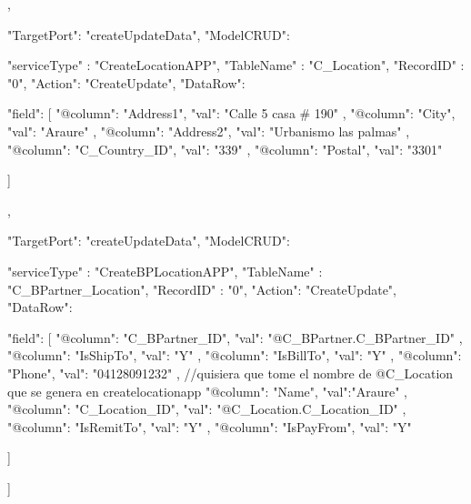 {{{{                },
                {
                "TargetPort": "createUpdateData",
                "ModelCRUD": {
                "serviceType" : "CreateLocationAPP",
                "TableName" : "C_Location",
                "RecordID" : "0",
                "Action": "CreateUpdate",
                 "DataRow": {
                "field": [
                    {
                        "@column": "Address1",
                        "val": "Calle 5 casa # 190"
                    },
                    {
                        "@column": "City",
                        "val": "Araure"
                    },
                    {
                        "@column": "Address2",
                        "val": "Urbanismo las palmas"
                    },
                    {
                        "@column": "C_Country_ID",
                        "val": "339"
                    },
                    {
                        "@column": "Postal",
                        "val": "3301"
                    }
                 
                ]
                }


                }

                
                
                },
                {
                "TargetPort": "createUpdateData",
                "ModelCRUD": {
                "serviceType" : "CreateBPLocationAPP",
                "TableName" : "C_BPartner_Location",
                "RecordID" : "0",
                "Action": "CreateUpdate",
                 "DataRow": {
                "field": [
                    {
                        "@column": "C_BPartner_ID",
                        "val": "@C_BPartner.C_BPartner_ID"
                    },
                     {
                        "@column": "IsShipTo",
                        "val": "Y"
                    },
                       {
                        "@column": "IsBillTo",
                        "val": "Y"
                    },
                       {
                        "@column": "Phone",
                        "val": "04128091232"
                    },
                    {
                        //quisiera que tome el nombre de @C_Location que se genera en createlocationapp
                        "@column": "Name",
                        "val":"Araure"
                    },
                    {
                        "@column": "C_Location_ID",
                        "val": "@C_Location.C_Location_ID"
                    },
                    {
                        "@column": "IsRemitTo",
                        "val": "Y"
                    },
                    {
                        "@column": "IsPayFrom",
                        "val": "Y"
                    }
                 
                ]
                }


                }

                
                
                }

            ]
        }



    }


}